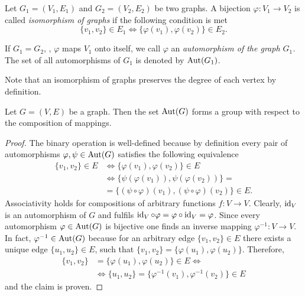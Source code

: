 \begin{defin}
\begin{thmlist}
\item Let $G_1=(V_1,E_1)$ and $G_2=(V_2,E_2)$ be two graphs. A bijection $\varphi\colon V_1 \to V_2$ is called \emph{isomorphism of graphs} if the following condition is met
\begin{equation*}
\lbrace v_1,v_2\rbrace\in E_1 \Leftrightarrow \lbrace \varphi(v_1),\varphi(v_2)\rbrace\in E_2.
\end{equation*}
\item If $G_1=G_2$,  \ie, $\varphi$ maps $V_1$ onto itself, we call $\varphi$ an \emph{automorphism of the graph $G_1$.} The set of all automorphisms of $G_1$ is denoted by $\operatorname{Aut}(G_1)$.
\end{thmlist}
\end{defin}
\begin{rem}
Note that an isomorphism of graphs preserves the degree of each vertex by definition.
\end{rem}
\begin{thm}\label{thm:Graph-Automorphisms Form a Group}
Let $G=(V,E)$ be a graph. Then the set $\operatorname{Aut}(G)$ forms a group with respect to the composition of mappings.
\end{thm}
\begin{proof}\sloppypar
The binary operation is well-defined because by definition every pair of automorphisms $\varphi,\psi\in\operatorname{Aut}(G)$ satisfies the following equivalence
\begin{align*}
\lbrace v_1,v_2\rbrace\in E&\Leftrightarrow\lbrace \varphi(v_1),\varphi(v_2)\rbrace\in E\\
&\Leftrightarrow\lbrace \psi(\varphi(v_1)),\psi(\varphi(v_2))\rbrace=\\
&=\lbrace (\psi\circ\varphi)(v_1),(\psi\circ\varphi)(v_2)\rbrace\in E.
\end{align*}
Associativity holds for compositions of arbitrary functions $f\colon V\to V$. Clearly, $\operatorname{id}_V$ is an automorphism of $G$ and fulfils $\operatorname{id}_V\circ\varphi=\varphi\circ\operatorname{id}_V=\varphi$. Since every automorphism $\varphi\in\operatorname{Aut}(G)$ is bijective one finds an inverse mapping $\varphi^{-1}\colon V\to V$. In fact, $\varphi^{-1}\in\operatorname{Aut}(G)$ because for an arbitrary edge $\lbrace v_1,v_2\rbrace\in E$ there exists a unique edge $\lbrace u_1,u_2\rbrace\in E$, such that $\lbrace v_1,v_2\rbrace=\lbrace \varphi(u_1),\varphi(u_2)\rbrace$. Therefore,
\begin{align*}
\lbrace v_1,v_2\rbrace&=\lbrace \varphi(u_1),\varphi(u_2)\rbrace\in E\Leftrightarrow\\
&\Leftrightarrow \lbrace u_1,u_2\rbrace=\lbrace \varphi^{-1}(v_1),\varphi^{-1}(v_2)\rbrace\in E
\end{align*}
and the claim is proven.
\end{proof}